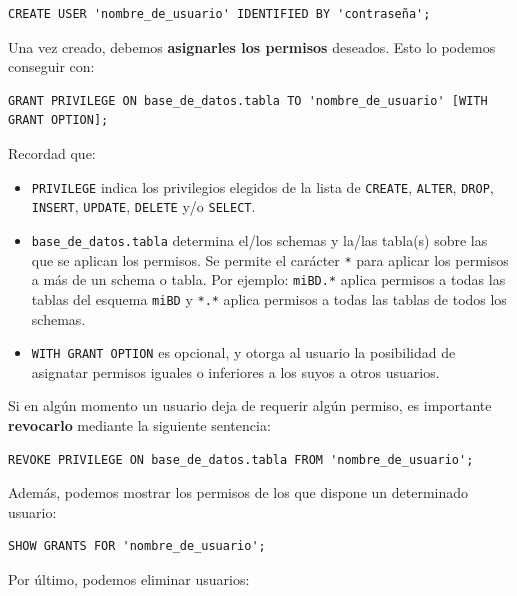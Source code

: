 \documentclass[a4paper]{article}
\begin{document}
\begin{verbatim}
CREATE USER 'nombre_de_usuario' IDENTIFIED BY 'contraseña';
\end{verbatim}

Una vez creado, debemos \textbf{asignarles los permisos} deseados. Esto lo podemos conseguir con:

\begin{verbatim}
GRANT PRIVILEGE ON base_de_datos.tabla TO 'nombre_de_usuario' [WITH GRANT OPTION];
\end{verbatim}

Recordad que:

\begin{itemize}
    \item \texttt{PRIVILEGE} indica los privilegios elegidos de la lista de \texttt{CREATE}, \texttt{ALTER}, \texttt{DROP}, \texttt{INSERT}, \texttt{UPDATE}, \texttt{DELETE} y/o \texttt{SELECT}.
    
    \item \texttt{base\_de\_datos.tabla} determina el/los schemas y la/las tabla(s) sobre las que se aplican los permisos. Se permite el carácter \texttt{*} para aplicar los permisos a más de un schema o tabla. Por ejemplo: \texttt{miBD.*}  aplica permisos a todas las tablas del esquema \texttt{miBD} y \texttt{*.*}  aplica permisos a todas las tablas de todos los schemas.
    
    \item \texttt{WITH GRANT OPTION} es opcional, y otorga al usuario la posibilidad de asignatar permisos iguales o inferiores a los suyos a otros usuarios.
\end{itemize}

Si en algún momento un usuario deja de requerir algún permiso, es importante \textbf{revocarlo} mediante la siguiente sentencia:

\begin{verbatim}
REVOKE PRIVILEGE ON base_de_datos.tabla FROM 'nombre_de_usuario';
\end{verbatim}

Además, podemos mostrar los permisos de los que dispone un determinado usuario:

\begin{verbatim}
SHOW GRANTS FOR 'nombre_de_usuario';
\end{verbatim}

Por último, podemos eliminar usuarios:
\end{document}

